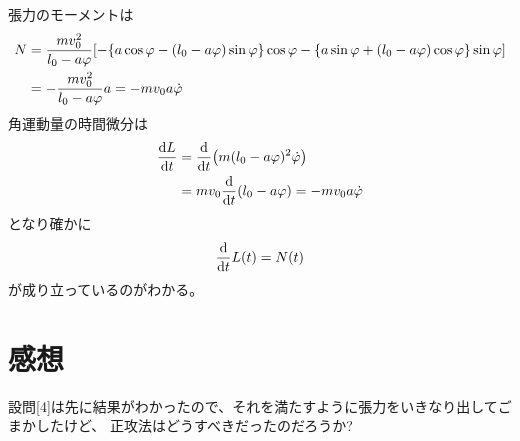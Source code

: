 \documentclass[../ap_2012.tex]{subfiles}
\begin{document}
\section{}
張力のモーメントは
\begin{equation}\begin{aligned}[b]
    N &= \frac{mv_0^2}{l_0-a\varphi}\qty[
        -\qty{a\cos\varphi-(l_0-a\varphi)\sin\varphi}\cos\varphi
        -\qty{a\sin\varphi+(l_0-a\varphi)\cos\varphi}\sin\varphi]\\
    &=-\frac{mv_0^2}{l_0-a\varphi}a = -mv_0 a\dot{\varphi}
\end{aligned}\end{equation}
角運動量の時間微分は
\begin{equation}\begin{aligned}[b]
    \dv{L}{t} &= \dv{t}\qty(m(l_0-a\varphi)^2\dot{\varphi})\\
    &=mv_0\dv{t}\qty(l_0-a\varphi) = -mv_0 a\dot{\varphi}
\end{aligned}\end{equation}
となり確かに
\begin{equation}\begin{aligned}[b]
    \dv{t}L(t)=N(t)
\end{aligned}\end{equation}
が成り立っているのがわかる。

\section*{感想}
設問[4]は先に結果がわかったので、それを満たすように張力をいきなり出してごまかしたけど、
正攻法はどうすべきだったのだろうか?
\end{document}
